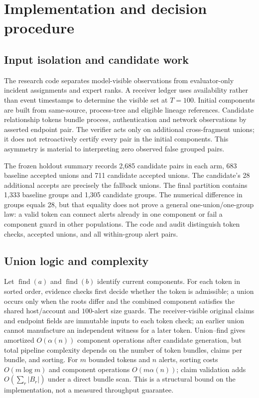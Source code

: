\section{Implementation and decision procedure}\label{sec:implementation}
\subsection{Input isolation and candidate work}
The research code separates model-visible observations from evaluator-only incident assignments and expert ranks. A receiver ledger uses availability rather than event timestamps to determine the visible set at $T=100$. Initial components are built from same-source, process-tree and eligible lineage references. Candidate relationship tokens bundle process, authentication and network observations by asserted endpoint pair. The verifier acts only on additional cross-fragment unions; it does not retroactively certify every pair in the initial components. This asymmetry is material to interpreting zero observed false grouped pairs.

The frozen holdout summary records 2,685 candidate pairs in each arm, 683 baseline accepted unions and 711 candidate accepted unions. The candidate's 28 additional accepts are precisely the fallback unions. The final partition contains 1,333 baseline groups and 1,305 candidate groups. The numerical difference in groups equals 28, but that equality does not prove a general one-union/one-group law: a valid token can connect alerts already in one component or fail a component guard in other populations. The code and audit distinguish token checks, accepted unions, and all within-group alert pairs.

\subsection{Union logic and complexity}
Let $\operatorname{find}(a)$ and $\operatorname{find}(b)$ identify current components. For each token in sorted order, evidence checks first decide whether the token is admissible; a union occurs only when the roots differ and the combined component satisfies the shared host/account and $100$-alert size guards. The receiver-visible original claims and endpoint fields are immutable inputs to each token check; an earlier union cannot manufacture an independent witness for a later token. Union--find gives amortized $O(\alpha(n))$ component operations after candidate generation, but total pipeline complexity depends on the number of token bundles, claims per bundle, and sorting. For $m$ bounded tokens and $n$ alerts, sorting costs $O(m\log m)$ and component operations $O(m\alpha(n))$; claim validation adds $O(\sum_r |B_r|)$ under a direct bundle scan. This is a structural bound on the implementation, not a measured throughput guarantee.


